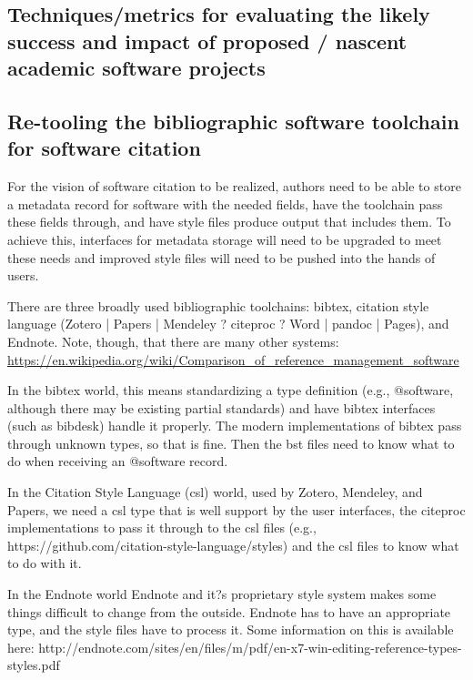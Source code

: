 \documentclass[a4paper,UKenglish]{dagman}
\begin{document}
\subsection{Techniques/metrics for evaluating the likely success and impact of proposed / nascent academic software projects}

\subsection{Re-tooling the bibliographic software toolchain for software citation}

For the vision of software citation to be realized, authors need to be able to store a metadata record for software with the needed fields, have the toolchain pass these fields through, and have style files produce output that includes them. To achieve this, interfaces for metadata storage will need to be upgraded to meet these needs and improved style files will need to be pushed into the hands of users.

There are three broadly used bibliographic toolchains: bibtex, citation style language (Zotero | Papers | Mendeley ? citeproc ? Word | pandoc | Pages), and Endnote. Note, though, that there are many other systems:
\url{https://en.wikipedia.org/wiki/Comparison_of_reference_management_software}

In the bibtex world, this means standardizing a type definition (e.g., @software, although there may be existing partial standards) and have bibtex interfaces (such as bibdesk) handle it properly. The modern implementations of bibtex pass through unknown types, so that is fine. Then the bst files need to know what to do when receiving an @software record.

In the Citation Style Language (csl) world, used by Zotero, Mendeley, and Papers, we need a csl type that is well support by the user interfaces, the citeproc implementations to pass it through to the csl files (e.g., https://github.com/citation-style-language/styles) and the csl files to know what to do with it.

In the Endnote world Endnote and it?s proprietary style system makes some things difficult to change from the outside. Endnote has to have an appropriate type, and the style files have to process it.  Some information on this is available here: http://endnote.com/sites/en/files/m/pdf/en-x7-win-editing-reference-types-styles.pdf
\end{document}
